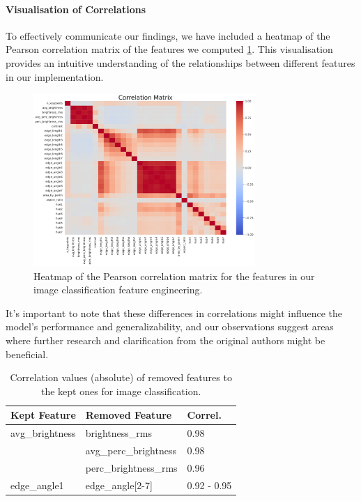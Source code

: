 \paragraph{Visualisation of Correlations}
To effectively communicate our findings, we have included a heatmap of the Pearson correlation matrix of the features we computed \ref{fig:correlation_matrix}. This visualisation provides an intuitive understanding of the relationships between different features in our implementation.

\begin{figure}[h]
	\centering
	\includegraphics[width=0.75\textwidth]{figures/cv_corr_matrix.pdf}
	\caption{Heatmap of the Pearson correlation matrix for the features in our image classification feature engineering.}
	\label{fig:correlation_matrix}
\end{figure}

It's important to note that these differences in correlations might influence the model's performance and generalizability, and our observations suggest areas where further research and clarification from the original authors might be beneficial.

\begin{table}[h]
	\centering
	\caption{Correlation values (absolute) of removed features to the kept ones for image classification.}
	\begin{tabular}{lll}
		\hline
		\textbf{Kept Feature} & \textbf{Removed Feature} & \textbf{Correl.} \\ \hline
		avg\_brightness       & brightness\_rms          & 0.98             \\
		                      & avg\_perc\_brightness    & 0.98             \\
		                      & perc\_brightness\_rms    & 0.96             \\
		edge\_angle1          & edge\_angle[2-7]         & 0.92 - 0.95      \\ \hline
	\end{tabular}
\end{table}



